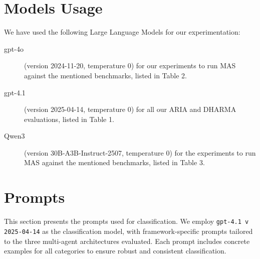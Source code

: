 \section{Models Usage}
\label{app:model_usage}
We have used the following Large Language Models for our experimentation:

\begin{description}
    \item[gpt-4o] (version 2024-11-20, temperature 0) for our experiments to run MAS against the mentioned benchmarks, listed in Table 2.
    \item[gpt-4.1] (version 2025-04-14, temperature 0) for all our ARIA and DHARMA evaluations, listed in Table 1.
    \item[Qwen3] (version 30B-A3B-Instruct-2507, temperature 0) for the experiments to run MAS against the mentioned benchmarks, listed in Table 3.
\end{description}





\section{\metricn Prompts}
\label{app:prompts_metric}

This section presents the prompts used for \metricn classification. We employ \texttt{gpt-4.1 v 2025-04-14} as the classification model, with framework-specific prompts tailored to the three multi-agent architectures evaluated. Each prompt includes concrete examples for all \metricn categories to ensure robust and consistent classification.



